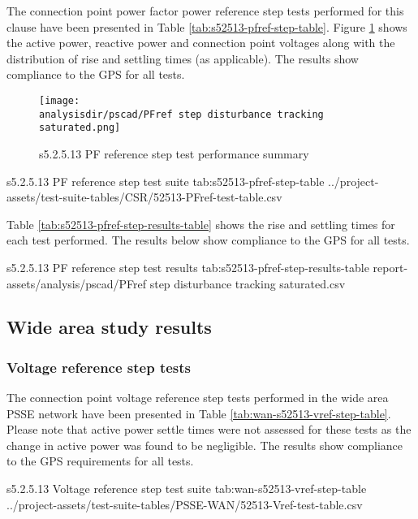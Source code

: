 \documentclass{../grid-link-report}
\newcommand{\projectassetsdir}{../project-assets}
\newcommand{\analysisdir}{report-assets/analysis}
\begin{document}
	The connection point power factor power reference step tests performed for this clause have been presented in Table \ref{tab:s52513-pfref-step-table}. Figure  \ref{fig:s52513-pfref-step-saturated-summary-plot} shows the active power, reactive power and connection point voltages along with the distribution of rise and settling times (as applicable). The results show compliance to the GPS for all tests.
	
	\begin{figure}[H]
		\centering
		\texttt{[image: \\analysisdir/pscad/PFref step disturbance tracking saturated.png]}
		\caption{s5.2.5.13 PF reference step test performance summary}
		\label{fig:s52513-pfref-step-saturated-summary-plot}
	\end{figure}
	

	
	{
		\fontsize{6}{8}\selectfont
		\autoscaledlongtable
		{s5.2.5.13 PF reference step test suite}
		{tab:s52513-pfref-step-table}
		{\projectassetsdir/test-suite-tables/CSR/52513-PFref-test-table.csv}
	}

	
	Table \ref{tab:s52513-pfref-step-results-table} shows the rise and settling times for each test performed. The results below show compliance to the GPS for all tests.
	
	
	{
		\fontsize{6.5}{9}\selectfont
		\autoscaledlongtable
		{s5.2.5.13 PF reference step test results}
		{tab:s52513-pfref-step-results-table}
		{report-assets/analysis/pscad/PFref step disturbance tracking saturated.csv}
	}
	
	\subsection{Wide area study results}
	
	\subsubsection{Voltage reference step tests}
	
	
	The connection point voltage reference step tests performed in the wide area PSSE network have been presented in Table \ref{tab:wan-s52513-vref-step-table}. Please note that active power settle times were not assessed for these tests as the change in active power was found to be negligible. The results show compliance to the GPS requirements for all tests.	
	


	
	{
		\fontsize{6}{8}\selectfont
		\autoscaledlongtable
		{s5.2.5.13 Voltage reference step test suite}
		{tab:wan-s52513-vref-step-table}
		{\projectassetsdir/test-suite-tables/PSSE-WAN/52513-Vref-test-table.csv}
	}
	
\end{document}
